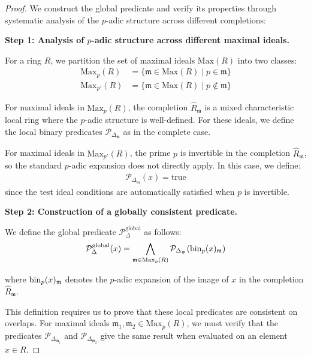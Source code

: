 \begin{proof}
We construct the global predicate and verify its properties through systematic analysis of the $p$-adic structure across different completions:

\textbf{Step 1: Analysis of $p$-adic structure across different maximal ideals.}

For a ring $R$, we partition the set of maximal ideals $\text{Max}(R)$ into two classes:
\begin{align*}
\text{Max}_p(R) &= \{\mathfrak{m} \in \text{Max}(R) \mid p \in \mathfrak{m}\} \\
\text{Max}_{p'}(R) &= \{\mathfrak{m} \in \text{Max}(R) \mid p \not\in \mathfrak{m}\}
\end{align*}

For maximal ideals in $\text{Max}_p(R)$, the completion $\hat{R}_{\mathfrak{m}}$ is a mixed characteristic local ring where the $p$-adic structure is well-defined. For these ideals, we define the local binary predicates $\mathcal{P}_{\Delta_{\mathfrak{m}}}$ as in the complete case.

For maximal ideals in $\text{Max}_{p'}(R)$, the prime $p$ is invertible in the completion $\hat{R}_{\mathfrak{m}}$, so the standard $p$-adic expansion does not directly apply. In this case, we define:
\begin{align*}
\mathcal{P}_{\Delta_{\mathfrak{m}}}(x) = \text{true}
\end{align*}
since the test ideal conditions are automatically satisfied when $p$ is invertible.

\textbf{Step 2: Construction of a globally consistent predicate.}

We define the global predicate $\mathcal{P}_{\Delta}^{\text{global}}$ as follows:
\begin{align*}
\mathcal{P}_{\Delta}^{\text{global}}(x) = \bigwedge_{\mathfrak{m} \in \text{Max}_p(R)} \mathcal{P}_{\Delta_{\mathfrak{m}}}(\operatorname{bin}_p(x)_{\mathfrak{m}})
\end{align*}

where $\operatorname{bin}_p(x)_{\mathfrak{m}}$ denotes the $p$-adic expansion of the image of $x$ in the completion $\hat{R}_{\mathfrak{m}}$.

This definition requires us to prove that these local predicates are consistent on overlaps. For maximal ideals $\mathfrak{m}_1, \mathfrak{m}_2 \in \text{Max}_p(R)$, we must verify that the predicates $\mathcal{P}_{\Delta_{\mathfrak{m}_1}}$ and $\mathcal{P}_{\Delta_{\mathfrak{m}_2}}$ give the same result when evaluated on an element $x \in R$.


\end{proof}
